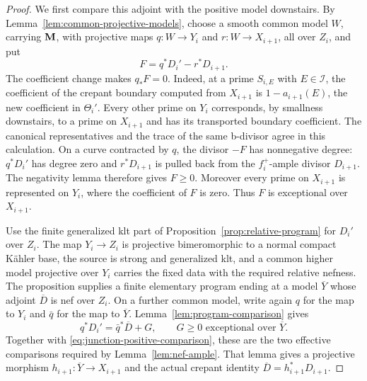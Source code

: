 \begin{proof}
We first compare this adjoint with the positive model downstairs.  By
Lemma~\ref{lem:common-projective-models}, choose a smooth common
model $W$, carrying $\mathbf{M}$, with projective maps
$q:W\to Y_i$ and $r:W\to X_{i+1}$, all over $Z_i$, and put
\begin{equation}\label{eq:junction-positive-comparison}
                         F=q^*D_i'-r^*D_{i+1}.
\end{equation}
The coefficient change makes $q_*F=0$.  Indeed, at a prime $S_{i,E}$ with
$E\in\mathcal I$, the coefficient of the crepant boundary computed from
$X_{i+1}$ is $1-a_{i+1}(E)$, the new coefficient in $\Theta_i'$.
Every other prime on $Y_i$ corresponds, by smallness downstairs, to a
prime on $X_{i+1}$ and has its transported boundary coefficient.  The
canonical representatives and the trace of the same b-divisor agree in
this calculation.  On a curve contracted by $q$, the divisor $-F$ has
nonnegative degree: $q^*D_i'$ has degree zero and $r^*D_{i+1}$ is pulled
back from the $f_i^+$-ample divisor $D_{i+1}$.  The negativity
lemma therefore gives $F\geq0$.  Moreover every prime on $X_{i+1}$ is
represented on $Y_i$, where the coefficient of $F$ is zero.  Thus $F$ is
exceptional over $X_{i+1}$.

Use the finite generalized klt part of
Proposition~\ref{prop:relative-program} for $D_i'$ over $Z_i$.  The map
$Y_i\to Z_i$ is projective bimeromorphic to a normal compact K\"ahler
base, the source is strong and generalized klt, and a common higher model
projective over $Y_i$ carries the fixed data with the
required relative nefness.  The proposition supplies a finite elementary
program ending at a model $\overline Y$ whose adjoint $\overline D$ is nef
over $Z_i$.  On a further common model, write again $q$ for the map to
$Y_i$ and $\bar q$ for the map to $\overline Y$.
Lemma~\ref{lem:program-comparison} gives
\[
              q^*D_i'=\bar q^*\overline D+G,
              \qquad G\geq0\text{ exceptional over }\overline Y.
\]
Together with \eqref{eq:junction-positive-comparison}, these are the two
effective comparisons required by Lemma~\ref{lem:nef-ample}.  That lemma
gives a projective morphism $h_{i+1}:\overline Y\to X_{i+1}$ and the
actual crepant identity $\overline D=h_{i+1}^*D_{i+1}$.


\end{proof}
